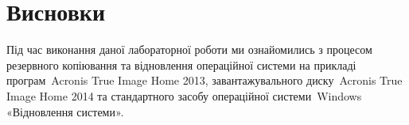 \documentclass[
	a4paper,
	oneside,
	DIV = 12,
	fontsize = 13pt,
	headings = normal,
]{scrartcl}
\begin{document}
		\section{Висновки}
			Під час виконання даної лабораторної роботи ми ознайомились з процесом резервного копіювання та відновлення операційної системи на прикладі програм~\textenglish{Acronis True Image Home 2013}, завантажувального диску~\textenglish{Acronis True Image Home 2014} та стандартного засобу операційної системи~\textenglish{Windows} «Відновлення системи».
\end{document}
